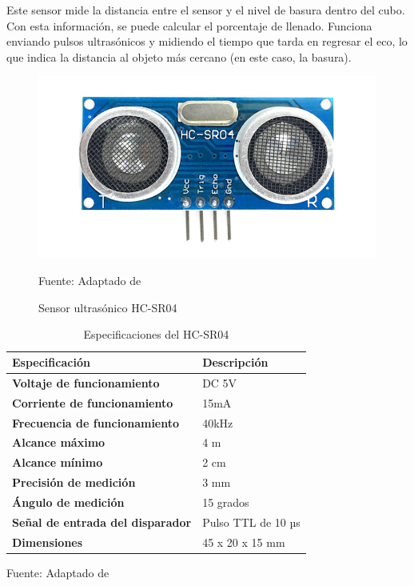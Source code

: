 Este sensor mide la distancia entre el sensor y el nivel de basura dentro del cubo. Con esta información, se puede calcular el porcentaje de llenado. Funciona enviando pulsos ultrasónicos y midiendo el tiempo que tarda en regresar el eco, lo que indica la distancia al objeto más cercano (en este caso, la basura).

\begin{figure}[htb]
	\centering
	\includegraphics[scale  = 0.50]{Imagenes/ultra.png}
	\caption{Sensor ultrasónico HC-SR04}{Fuente: Adaptado de~\cite{ultrasonc}}

\end{figure}

\begin{table}[H]
    \centering
    \begin{tabularx}{\textwidth}{|l|X|} %
        \hline
        \textbf{Especificación} & \textbf{Descripción} \\ 
        \hline
        \textbf{Voltaje de funcionamiento} & DC 5V \\ 
        \hline
        \textbf{Corriente de funcionamiento} & 15mA \\ 
        \hline
        \textbf{Frecuencia de funcionamiento} & 40kHz \\ 
        \hline
        \textbf{Alcance máximo} & 4 m \\ 
        \hline
        \textbf{Alcance mínimo} & 2 cm \\ 
        \hline
        \textbf{Precisión de medición} & 3 mm \\ 
        \hline
        \textbf{Ángulo de medición} & 15 grados \\ 
        \hline
        \textbf{Señal de entrada del disparador} & Pulso TTL de 10 µs \\ 
        \hline
        \textbf{Dimensiones} & 45 x 20 x 15 mm \\ 
        \hline
    \end{tabularx}
    \caption{Especificaciones del HC-SR04}{Fuente: Adaptado de~\cite{ultrasonc}}
    \label{tab:especificaciones_hc_sr04}
\end{table}

